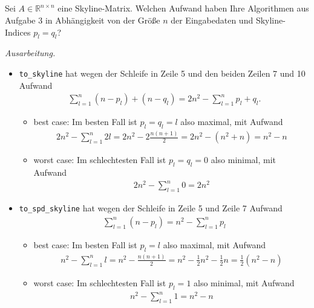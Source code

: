 \documentclass[titlepage]{article}
\newenvironment{ausarbeitung}{\vspace{3mm}\noindent\textit{Ausarbeitung.}}{}
\begin{document}
\subsection{}
Sei $A \in \mathbb{R}^{n\times n}$ eine Skyline-Matrix. Welchen Aufwand haben Ihre Algorithmen aus Aufgabe 3 in Abhängigkeit von der Größe $n$ der Eingabedaten und Skyline-Indices $p_l = q_l$?

\begin{ausarbeitung}
	
	\begin{itemize}
		\item \texttt{to\_skyline} hat wegen der Schleife in Zeile 5 und den beiden Zeilen 7 und 10 Aufwand
		\begin{align*}
			\sum_{l=1}^{n} (n-p_l)+(n-q_l) = 2n^2-\sum_{l=1}^{n}p_l+q_l.
		\end{align*}
		
		\begin{itemize}
			\item best case: Im besten Fall ist $p_l = q_l = l$ also maximal, mit Aufwand
			\begin{align*}
				2n^2-\sum_{l=1}^{n}2l = 2n^2 - 2\frac{n(n+1)}{2} = 2n^2-(n^2+n) = n^2 - n
			\end{align*}
			
			\item worst case: Im schlechtesten Fall ist $p_l = q_l = 0$ also minimal, mit Aufwand
			\begin{align*}
				2n^2 - \sum_{l=1}^{n}0 = 2n^2
			\end{align*}
		\end{itemize}
		
		\item \texttt{to\_spd\_skyline} hat wegen der Schleife in Zeile 5 und Zeile 7 Aufwand 
		\begin{align*}
			\sum_{l=1}^{n}(n-p_l) = n^2 - \sum_{l=1}^{n}p_l
		\end{align*}
		\begin{itemize}
			\item best case: Im besten Fall ist $p_l = l$ also maximal, mit Aufwand 
			\begin{align*}
				n^2 - \sum_{l=1}^{n}l = n^2 - \frac{n(n+1)}{2} = n^2 - \frac{1}{2}n^2 - \frac{1}{2}n = \frac{1}{2}(n^2-n)
			\end{align*}
			\item worst case: Im schlechtesten Fall ist $p_l=1$ also minimal, mit Aufwand 
			\begin{align*}
				n^2 - \sum_{l=1}^{n}1 = n^2 - n
			\end{align*}
		\end{itemize}
	

\end{itemize}
\end{ausarbeitung}
\end{document}

